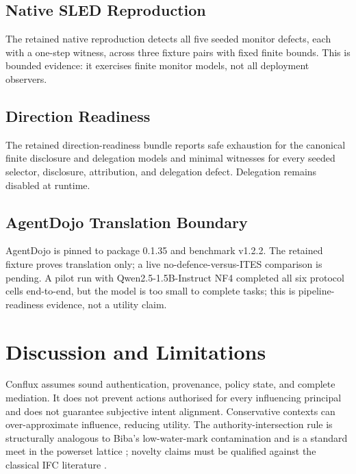 \documentclass{article}
\begin{document}
\subsection{Native SLED Reproduction}

The retained native reproduction detects all five seeded monitor defects,
each with a one-step witness, across three fixture pairs with fixed finite
bounds. This is bounded evidence: it exercises finite monitor models, not
all deployment observers.

\subsection{Direction Readiness}

The retained direction-readiness bundle reports safe exhaustion for the
canonical finite disclosure and delegation models and minimal witnesses for
every seeded selector, disclosure, attribution, and delegation defect.
Delegation remains disabled at runtime.



\subsection{AgentDojo Translation Boundary}

AgentDojo is pinned to package 0.1.35 and benchmark v1.2.2. The retained
fixture proves translation only; a live no-defence-versus-ITES comparison
is pending. A pilot run with Qwen2.5-1.5B-Instruct NF4 completed all six
protocol cells end-to-end, but the model is too small to complete tasks;
this is pipeline-readiness evidence, not a utility claim.




\section{Discussion and Limitations}

Conflux assumes sound authentication, provenance, policy state, and complete
mediation. It does not prevent actions authorised for every influencing
principal and does not guarantee subjective intent alignment. Conservative
contexts can over-approximate influence, reducing utility. The
authority-intersection rule is structurally analogous to Biba's
low-water-mark contamination \citep{biba1977} and is a standard meet in
the powerset lattice \citep{denning1976}; novelty claims must be qualified
against the classical IFC literature
\citep{sabelfeld2003,myersliskov,declassification-survey,robust-declassification,attacker-control,nonmalleable-ifc}.
\end{document}
